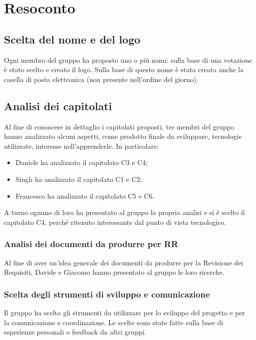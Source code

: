 \section{Resoconto}
\subsection{Scelta del nome e del logo}
Ogni membro del gruppo ha proposto uno o più nomi: sulla base di una votazione è stato scelto \groupName{} e creato il logo. Sulla base di questo nome è stata creata anche la casella di posta elettronica \groupEmail{} (non presente nell'ordine del giorno).

\subsection{Analisi dei capitolati}
Al fine di conoscere in dettaglio i capitolati proposti, tre membri del gruppo hanno analizzato alcuni aspetti, come prodotto finale da sviluppare, tecnologie utilizzate, interesse nell'apprenderle. In particolare:
\begin{itemize}
    \item Daniele ha analizzato il capitolato C3 e C4;
    \item Singh ha analizzato il capitolato C1 e C2;
    \item Francesco ha analizzato il capitolato C5 e C6.
\end{itemize}
A turno ognuno di loro ha presentato al gruppo la propria analisi e si è scelto il capitolato C4, perché ritenuto interessante dal punto di vista tecnologico.

\subsubsection{Analisi dei documenti da produrre per RR}
Al fine di aver un'idea generale dei documenti da produrre per la Revisione dei Requisiti, Davide e Giacomo hanno presentato al gruppo le loro ricerche.

\subsubsection{Scelta degli strumenti di sviluppo e comunicazione}
Il gruppo ha scelto gli strumenti da utilizzare per lo sviluppo del progetto e per la comunicazione e coordinazione. Le scelte sono state fatte sulla base di esperienze personali o feedback da altri gruppi. 